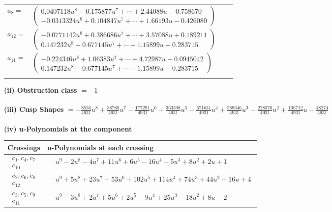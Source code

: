 \documentclass[1p]{elsarticle_modified}
\theoremstyle{definition}
\begin{document}
\begin{tabular}{m{7pt} m{180pt} m{7pt} m{180pt} }
\flushright $a_{8}=$&$\begin{pmatrix}0.0407118 u^{8}-0.175877 u^{7}+\cdots+2.44088 u-0.758670\\-0.0313324 u^{8}+0.104847 u^{7}+\cdots+1.66193 u-0.426080\end{pmatrix}$ \\
\flushright $a_{12}=$&$\begin{pmatrix}-0.0771142 u^{8}+0.386686 u^{7}+\cdots+3.57088 u+0.189211\\0.147232 u^{8}-0.677145 u^{7}+\cdots-1.15899 u+0.283715\end{pmatrix}$ \\
\flushright $a_{11}=$&$\begin{pmatrix}-0.224346 u^{8}+1.06383 u^{7}+\cdots+4.72987 u-0.0945042\\0.147232 u^{8}-0.677145 u^{7}+\cdots-1.15899 u+0.283715\end{pmatrix}$\\&\end{tabular}
\flushleft \textbf{(ii) Obstruction class $= -1$}\\~\\
\flushleft \textbf{(iii) Cusp Shapes $= -\frac{8556}{4931} u^8+\frac{38780}{4931} u^7-\frac{177291}{4931} u^6+\frac{363598}{4931} u^5-\frac{671631}{4931} u^4+\frac{589646}{4931} u^3-\frac{228370}{4931} u^2+\frac{136712}{4931} u-\frac{48274}{4931}$}\\~\\
\newpage\renewcommand{\arraystretch}{1}
\flushleft \textbf{(iv) u-Polynomials at the component}\newline \\
\begin{tabular}{m{50pt}|m{274pt}}
Crossings & \hspace{64pt}u-Polynomials at each crossing \\
\hline $$\begin{aligned}c_{1},c_{4},c_{7}\\c_{10}\end{aligned}$$&$\begin{aligned}
&u^9-2 u^8-4 u^7+11 u^6+6 u^5-16 u^4-5 u^3+8 u^2+2 u+1
\end{aligned}$\\
\hline $$\begin{aligned}c_{2},c_{6},c_{8}\\c_{12}\end{aligned}$$&$\begin{aligned}
&u^9+5 u^8+23 u^7+53 u^6+102 u^5+114 u^4+74 u^3+44 u^2+16 u+4
\end{aligned}$\\
\hline $$\begin{aligned}c_{3},c_{5},c_{9}\\c_{11}\end{aligned}$$&$\begin{aligned}
&u^9-3 u^8+2 u^7+5 u^6+2 u^5-9 u^4+25 u^3-18 u^2+8 u-2
\end{aligned}$\\
\hline
\end{tabular}\\~\\
\end{document}
